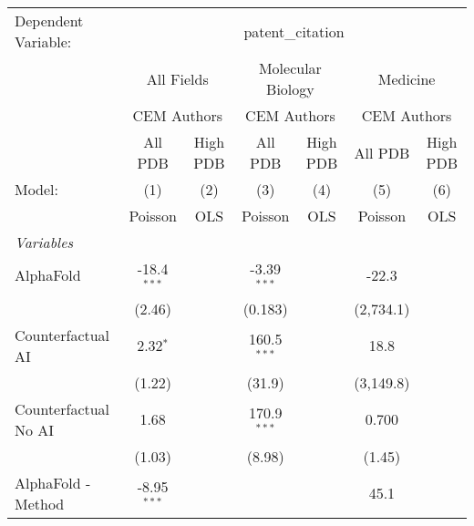 \begingroup
\centering
\begin{tabular}{lcccccc}
   \tabularnewline \midrule \midrule
   Dependent Variable: & \multicolumn{6}{c}{patent\_citation}\\
 & \multicolumn{2}{c}{All Fields} & \multicolumn{2}{c}{Molecular Biology} & \multicolumn{2}{c}{Medicine} \\
\cmidrule(lr){2-3} \cmidrule(lr){4-5} \cmidrule(lr){6-7}
 & \multicolumn{2}{c}{CEM Authors} & \multicolumn{2}{c}{CEM Authors} & \multicolumn{2}{c}{CEM Authors} \\
\cmidrule(lr){2-3} \cmidrule(lr){4-5} \cmidrule(lr){6-7}
 & \multicolumn{1}{c}{All PDB} & \multicolumn{1}{c}{High PDB} & \multicolumn{1}{c}{All PDB} & \multicolumn{1}{c}{High PDB} & \multicolumn{1}{c}{All PDB} & \multicolumn{1}{c}{High PDB} \\
\cmidrule(lr){2-2} \cmidrule(lr){3-3} \cmidrule(lr){4-4} \cmidrule(lr){5-5} \cmidrule(lr){6-6} \cmidrule(lr){7-7}
   Model:                                                     & (1)           & (2)  & (3)           & (4)  & (5)          & (6)\\  
                                                              &  Poisson      & OLS  & Poisson       & OLS  & Poisson      & OLS\\  
   \midrule
   \emph{Variables}\\
   AlphaFold                                                  & -18.4$^{***}$ &      & -3.39$^{***}$ &      & -22.3        &   \\   
                                                              & (2.46)        &      & (0.183)       &      & (2,734.1)    &   \\   
   Counterfactual AI                                          & 2.32$^{*}$    &      & 160.5$^{***}$ &      & 18.8         &   \\   
                                                              & (1.22)        &      & (31.9)        &      & (3,149.8)    &   \\   
   Counterfactual No AI                                       & 1.68          &      & 170.9$^{***}$ &      & 0.700        &   \\   
                                                              & (1.03)        &      & (8.98)        &      & (1.45)       &   \\   
   AlphaFold - Method                                         & -8.95$^{***}$ &      &               &      & 45.1         &   \\   

\end{tabular}
